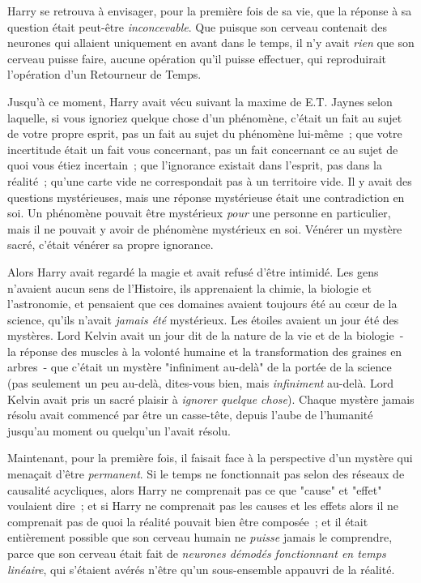 Harry se retrouva à envisager, pour la première fois de sa vie, que la réponse à sa question était peut-être \emph{inconcevable}. Que puisque son cerveau contenait des neurones qui allaient uniquement en avant dans le temps, il n'y avait \emph{rien} que son cerveau puisse faire, aucune opération qu'il puisse effectuer, qui reproduirait l'opération d'un Retourneur de Temps.

Jusqu'à ce moment, Harry avait vécu suivant la maxime de E.T. Jaynes selon laquelle, si vous ignoriez quelque chose d'un phénomène, c'était un fait au sujet de votre propre esprit, pas un fait au sujet du phénomène lui-même~; que votre incertitude était un fait vous concernant, pas un fait concernant ce au sujet de quoi vous étiez incertain~; que l'ignorance existait dans l'esprit, pas dans la réalité~; qu'une carte vide ne correspondait pas à un territoire vide. Il y avait des questions mystérieuses, mais une réponse mystérieuse était une contradiction en soi. Un phénomène pouvait être mystérieux \emph{pour} une personne en particulier, mais il ne pouvait y avoir de phénomène mystérieux en soi. Vénérer un mystère sacré, c'était vénérer sa propre ignorance.

Alors Harry avait regardé la magie et avait refusé d'être intimidé. Les gens n'avaient aucun sens de l'Histoire, ils apprenaient la chimie, la biologie et l'astronomie, et pensaient que ces domaines avaient toujours été au cœur de la science, qu'ils n'avait \emph{jamais été} mystérieux. Les étoiles avaient un jour été des mystères. Lord Kelvin avait un jour dit de la nature de la vie et de la biologie~- la réponse des muscles à la volonté humaine et la transformation des graines en arbres~- que c'était un mystère "infiniment au-delà" de la portée de la science (pas seulement un peu au-delà, dites-vous bien, mais \emph{infiniment} au-delà. Lord Kelvin avait pris un sacré plaisir à \emph{ignorer quelque chose}). Chaque mystère jamais résolu avait commencé par être un casse-tête, depuis l'aube de l'humanité jusqu'au moment ou quelqu'un l'avait résolu.

Maintenant, pour la première fois, il faisait face à la perspective d'un mystère qui menaçait d'être \emph{permanent}. Si le temps ne fonctionnait pas selon des réseaux de causalité acycliques, alors Harry ne comprenait pas ce que "cause" et "effet" voulaient dire~; et si Harry ne comprenait pas les causes et les effets alors il ne comprenait pas de quoi la réalité pouvait bien être composée~; et il était entièrement possible que son cerveau humain ne \emph{puisse} jamais le comprendre, parce que son cerveau était fait de \emph{neurones démodés fonctionnant en temps linéaire}, qui s'étaient avérés n'être qu'un sous-ensemble appauvri de la réalité.


